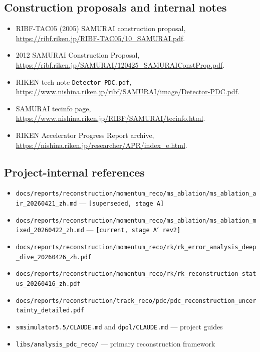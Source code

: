 \documentclass[a4paper, 11pt]{article}
\begin{document}
\subsection{Construction proposals and internal notes}
\begin{itemize}
  \item RIBF-TAC05 (2005) SAMURAI construction proposal, \url{https://ribf.riken.jp/RIBF-TAC05/10_SAMURAI.pdf}.
  \item 2012 SAMURAI Construction Proposal, \url{https://ribf.riken.jp/SAMURAI/120425_SAMURAIConstProp.pdf}.
  \item RIKEN tech note \texttt{Detector-PDC.pdf}, \url{https://www.nishina.riken.jp/ribf/SAMURAI/image/Detector-PDC.pdf}.
  \item SAMURAI tecinfo page, \url{https://www.nishina.riken.jp/RIBF/SAMURAI/tecinfo.html}.
  \item RIKEN Accelerator Progress Report archive, \url{https://nishina.riken.jp/researcher/APR/index_e.html}.
\end{itemize}

\subsection{Project-internal references}
\begin{itemize}
  \item \texttt{docs/reports/reconstruction/momentum\_reco/ms\_ablation/ms\_ablation\_air\_20260421\_zh.md} --- \texttt{[superseded, stage A]}
  \item \texttt{docs/reports/reconstruction/momentum\_reco/ms\_ablation/ms\_ablation\_mixed\_20260422\_zh.md} --- \texttt{[current, stage A$'$ rev2]}
  \item \texttt{docs/reports/reconstruction/momentum\_reco/rk/rk\_error\_analysis\_deep\_dive\_20260426\_zh.pdf}
  \item \texttt{docs/reports/reconstruction/momentum\_reco/rk/rk\_reconstruction\_status\_20260416\_zh.pdf}
  \item \texttt{docs/reports/reconstruction/track\_reco/pdc/pdc\_reconstruction\_uncertainty\_detailed.pdf}
  \item \texttt{smsimulator5.5/CLAUDE.md} and \texttt{dpol/CLAUDE.md} --- project guides
  \item \texttt{libs/analysis\_pdc\_reco/} --- primary reconstruction framework
\end{itemize}
\end{document}
